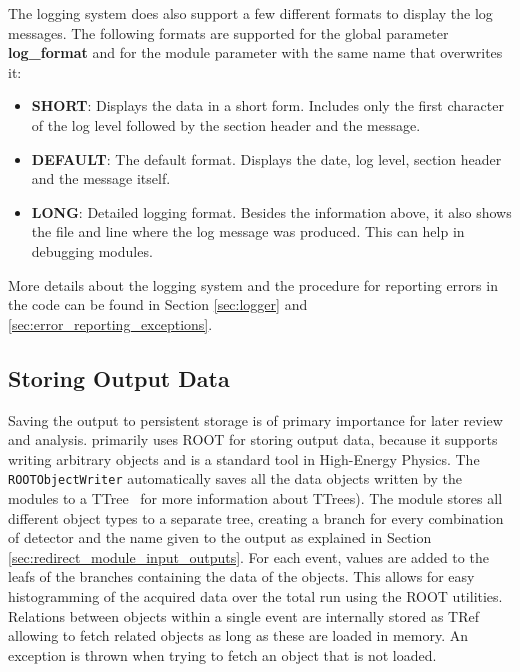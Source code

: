 The logging system does also support a few different formats to display the log messages. The following formats are supported for the global parameter \textbf{log\_format} and for the module parameter with the same name that overwrites it:
\begin{itemize}
\item \textbf{SHORT}: Displays the data in a short form. Includes only the first character of the log level followed by the section header and the message.
\item \textbf{DEFAULT}: The default format. Displays the date, log level, section header and the message itself. 
\item \textbf{LONG}: Detailed logging format. Besides the information above, it also shows the file and line where the log message was produced. This can help in debugging modules.
\end{itemize}

More details about the logging system and the procedure for reporting errors in the code can be found in Section \ref{sec:logger} and \ref{sec:error_reporting_exceptions}.

\subsection{Storing Output Data}
\label{sec:storing_output_data}
Saving the output to persistent storage is of primary importance for later review and analysis. \apsq primarily uses ROOT for storing output data, because it supports writing arbitrary objects and is a standard tool in High-Energy Physics. The \texttt{ROOTObjectWriter} automatically saves all the data objects written by the modules to a TTree~\cite{roottree} for more information about TTrees). The module stores all different object types to a separate tree, creating a branch for every combination of detector and the name given to the output as explained in Section \ref{sec:redirect_module_input_outputs}. For each event, values are added to the leafs of the branches containing the data of the objects. This allows for easy histogramming of the acquired data over the total run using the ROOT utilities. Relations between objects within a single event are internally stored as TRef allowing to fetch related objects as long as these are loaded in memory. An exception is thrown when trying to fetch an object that is not loaded.

